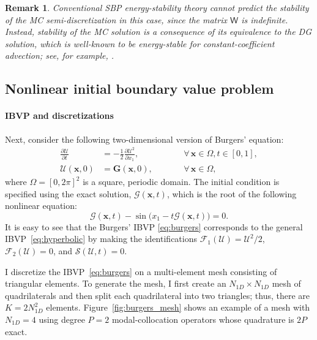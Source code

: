 \documentclass[pdflatex,sn-mathphys-num]{sn-jnl}%
\theoremstyle{thmstyleone}%
\theoremstyle{thmstyletwo}%
\newtheorem{remark}{Remark}%
\theoremstyle{thmstylethree}%
\newcommand{\mat}[1]{\ensuremath{\mathsf{#1}}}
\newcommand{\fnc}[1]{\ensuremath{\mathcal{#1}}}
\begin{document}
\begin{remark}
Conventional SBP energy-stability theory cannot predict the stability of the MC semi-discretization in this case, since the matrix $\mat{W}$ is indefinite.  Instead, stability of the MC solution is a consequence of its equivalence to the DG solution, which is well-known to be energy-stable for constant-coefficient advection; see, for example, \cite{Hesthaven2008nodal}.
\end{remark}

\subsection{Nonlinear initial boundary value problem}

\paragraph{IBVP and discretizations}

Next, consider the following two-dimensional version of Burgers' equation:
\begin{equation}\label{eq:burgers}
\begin{alignedat}{2}
    \frac{\partial \fnc{U}}{\partial t} &= -\frac{1}{2} \frac{\partial \fnc{U}^2}{\partial x_1},&\qquad &\forall\, \bm{x} \in \Omega, t \in [0,1], \\
    \fnc{U}(\bm{x},0) &= \bm{G}(\bm{x},0), &\qquad&\forall\, \bm{x} \in \Omega,
\end{alignedat}
\end{equation}
where $\Omega = [0,2\pi]^2$ is a square, periodic domain.  The initial condition is specified using the exact solution, $\fnc{G}(\bm{x},t)$, which is the root of the following nonlinear equation:
\begin{equation}
    \fnc{G}(\bm{x},t) - \sin\big(x_1 - t \fnc{G}(\bm{x},t)\big) = 0.
\end{equation}
It is easy to see that the Burgers' IBVP \eqref{eq:burgers} corresponds to the general IBVP~\eqref{eq:hyperbolic} by making the identifications $\fnc{F}_1(\fnc{U}) = \fnc{U}^2/2$, $\fnc{F}_2(\fnc{U}) = 0$, and $\fnc{S}(\fnc{U},t) = 0$.

I discretize the IBVP~\eqref{eq:burgers} on a multi-element mesh consisting of triangular elements.  To generate the mesh, I first create an $N_{1D}\times N_{1D}$ mesh of quadrilaterals and then split each quadrilateral into two triangles; thus, there are $K=2N_{1D}^2$ elements.  Figure~\ref{fig:burgers_mesh} shows an example of a mesh with $N_{1D} = 4$ using degree $P=2$ modal-collocation operators whose quadrature is $2P$ exact.
\end{document}
